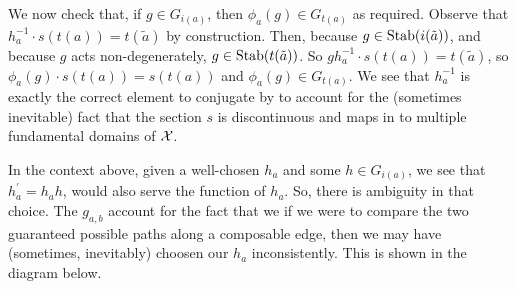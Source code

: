 We now check that, if $g \in G_{i(a)}$, then  $\phi_a(g) \in G_{t(a)}$ as required.
Observe that $h_a^{-1} \cdot s(t(a)) = t(\tilde{a})$ by construction.
Then, because $g \in \operatorname{Stab}(i(\tilde{a}))$, and because  $g$ acts non-degenerately,  $g \in \operatorname{Stab}(t(\tilde{a}))$.
So  $gh_a^{-1} \cdot s(t(a)) = t(\tilde{a})$, so $\phi_a(g) \cdot s(t(a)) = s(t(a))$ and  $\phi_a(g) \in G_{t(a)}$.
We see that $h_a^{-1}$ is exactly the correct element to conjugate by to account for the (sometimes inevitable) fact that the section $s$ is discontinuous and maps in to multiple fundamental domains of $\mathcal{X}$.

In the context above, given a well-chosen $h_a$ and some $h \in G_{i(a)}$, we see that $h^\prime_a = h_ah$, would also serve the function of $h_a$.
So, there is ambiguity in that choice.
The $g_{a,b}$ account for the fact that we if we were to compare the two guaranteed possible paths along a composable edge, then we may have (sometimes, inevitably) choosen our $h_a$ inconsistently.
This is shown in the diagram below.

\begin{center}
\end{center}

